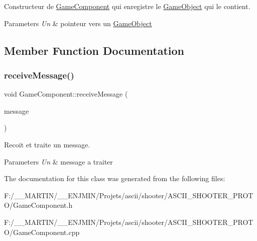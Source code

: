 Constructeur de \hyperlink{class_game_component}{Game\+Component} qui enregistre le \hyperlink{class_game_object}{Game\+Object} qui le contient. 


\begin{DoxyParams}{Parameters}
{\em Un} & pointeur vers un \hyperlink{class_game_object}{Game\+Object} \\
\hline
\end{DoxyParams}


\subsection{Member Function Documentation}
\hypertarget{class_game_component_a449c4a683e9bb42e0ab939a06e7b0640}{}\label{class_game_component_a449c4a683e9bb42e0ab939a06e7b0640} 
\subsubsection{\texorpdfstring{receive\+Message()}{receiveMessage()}}
{\footnotesize\ttfamily void Game\+Component\+::receive\+Message (\begin{DoxyParamCaption}\item[{G\+O\+Message}]{message }\end{DoxyParamCaption})\hspace{0.3cm}{\ttfamily [virtual]}}



Recoit et traite un message. 


\begin{DoxyParams}{Parameters}
{\em Un} & message a traiter \\
\hline
\end{DoxyParams}


The documentation for this class was generated from the following files\+:\begin{DoxyCompactItemize}
\item 
F\+:/\+\_\+\+\_\+\+M\+A\+R\+T\+I\+N/\+\_\+\+\_\+\+E\+N\+J\+M\+I\+N/\+Projets/ascii/shooter/\+A\+S\+C\+I\+I\+\_\+\+S\+H\+O\+O\+T\+E\+R\+\_\+\+P\+R\+O\+T\+O/Game\+Component.\+h\item 
F\+:/\+\_\+\+\_\+\+M\+A\+R\+T\+I\+N/\+\_\+\+\_\+\+E\+N\+J\+M\+I\+N/\+Projets/ascii/shooter/\+A\+S\+C\+I\+I\+\_\+\+S\+H\+O\+O\+T\+E\+R\+\_\+\+P\+R\+O\+T\+O/Game\+Component.\+cpp\end{DoxyCompactItemize}
